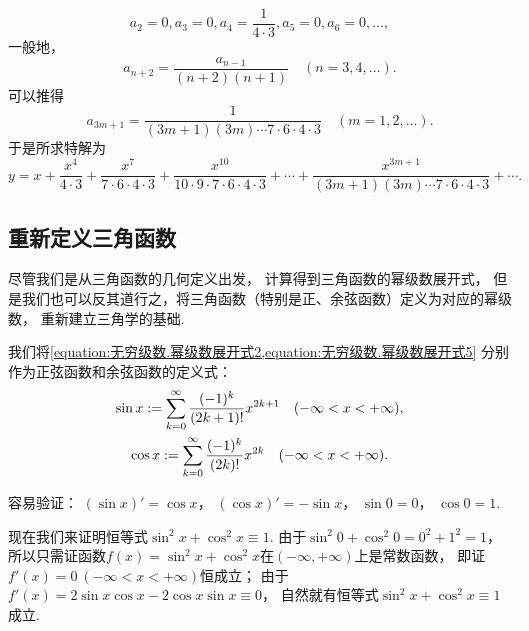 \begin{example}
\begin{solution}
\begin{equation*}
	a_2 = 0,
	a_3 = 0,
	a_4 = \frac{1}{4\cdot3},
	a_5 = 0,
	a_6 = 0,
	\dotsc,
\end{equation*}
一般地，\begin{equation*}
	a_{n+2} = \frac{a_{n-1}}{(n+2)(n+1)}
	\quad(n=3,4,\dotsc).
\end{equation*}
可以推得\begin{equation*}
	a_{3m+1} = \frac{1}{(3m+1)(3m) \dotsm 7\cdot6\cdot4\cdot3}
	\quad(m=1,2,\dotsc).
\end{equation*}
于是所求特解为\begin{equation*}
	y = x + \frac{x^4}{4\cdot3} + \frac{x^7}{7\cdot6\cdot4\cdot3}
	+ \frac{x^{10}}{10\cdot9\cdot7\cdot6\cdot4\cdot3}
	+ \dotsb
	+ \frac{x^{3m+1}}{(3m+1)(3m) \dotsm 7\cdot6\cdot4\cdot3}
	+ \dotsb.
\end{equation*}
\end{solution}
\end{example}

\subsection{重新定义三角函数}
尽管我们是从三角函数的几何定义出发，
计算得到三角函数的幂级数展开式，
但是我们也可以反其道行之，将三角函数（特别是正、余弦函数）定义为对应的幂级数，
重新建立三角学的基础.

我们将\cref{equation:无穷级数.幂级数展开式2,equation:无穷级数.幂级数展开式5}
分别作为正弦函数和余弦函数的定义式：
\begin{gather*}
	\sin x := \sum_{k=0}^\infty \frac{(-1)^k}{(2k+1)!} x^{2k+1}
	\quad(-\infty<x<+\infty), \\
	\cos x := \sum_{k=0}^\infty \frac{(-1)^k}{(2k)!} x^{2k}
	\quad(-\infty<x<+\infty).
\end{gather*}

容易验证：
\((\sin x)' = \cos x\)，
\((\cos x)' = - \sin x\)，
\(\sin 0 = 0\)，
\(\cos 0 = 1\).

现在我们来证明恒等式\(\sin^2 x + \cos^2 x \equiv 1\).
由于\(\sin^2 0 + \cos^2 0 = 0^2 + 1^2 = 1\)，
所以只需证函数\(f(x) = \sin^2 x + \cos^2 x\)在\((-\infty,+\infty)\)上是常数函数，
即证\(f'(x) = 0\ (-\infty<x<+\infty)\)恒成立；
由于\(f'(x) = 2 \sin x \cos x - 2 \cos x \sin x \equiv 0\)，
自然就有恒等式\(\sin^2 x + \cos^2 x \equiv 1\)成立.

